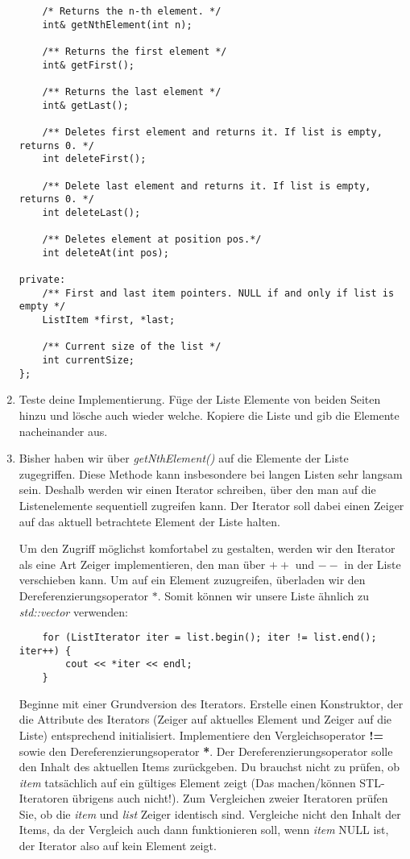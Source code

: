\begin{enumerate}
\begin{lstlisting}
	/* Returns the n-th element. */
	int& getNthElement(int n);

	/** Returns the first element */
	int& getFirst();

	/** Returns the last element */
	int& getLast();

	/** Deletes first element and returns it. If list is empty, returns 0. */
	int deleteFirst();

	/** Delete last element and returns it. If list is empty, returns 0. */
	int deleteLast();
	
	/** Deletes element at position pos.*/
	int deleteAt(int pos);

private:
	/** First and last item pointers. NULL if and only if list is empty */
	ListItem *first, *last;
	
	/** Current size of the list */
	int currentSize;
};
\end{lstlisting}

\item
Teste deine Implementierung.
Füge der Liste Elemente von beiden Seiten hinzu und lösche auch wieder welche.
Kopiere die Liste und gib die Elemente nacheinander aus.

\item 
Bisher haben wir über \emph{getNthElement()} auf die Elemente der Liste zugegriffen.
Diese Methode kann insbesondere bei langen Listen sehr langsam sein.
Deshalb werden wir einen Iterator schreiben, über den man auf die Listenelemente sequentiell zugreifen kann.
Der Iterator soll dabei einen Zeiger auf das aktuell betrachtete Element der Liste halten.

Um den Zugriff möglichst komfortabel zu gestalten, werden wir den Iterator als eine Art Zeiger implementieren, den man über \textbf{$++$} und \textbf{$--$} in der Liste verschieben kann.
Um auf ein Element zuzugreifen, überladen wir den Dereferenzierungsoperator $*$.
Somit können wir unsere Liste ähnlich zu \emph{std::vector} verwenden:
\begin{lstlisting}
	for (ListIterator iter = list.begin(); iter != list.end(); iter++) {
		cout << *iter << endl;
	}
\end{lstlisting}

Beginne mit einer Grundversion des Iterators.
Erstelle einen Konstruktor, der die Attribute des Iterators (Zeiger auf aktuelles Element und Zeiger auf die Liste) entsprechend initialisiert.
Implementiere den Vergleichsoperator \textbf{!=} sowie den Dereferenzierungsoperator \textbf{*}.
Der Dereferenzierungsoperator solle den Inhalt des aktuellen Items zurückgeben.
Du brauchst nicht zu prüfen, ob \emph{item} tatsächlich auf ein gültiges Element zeigt (Das machen/können STL-Iteratoren übrigens auch nicht!).
Zum Vergleichen zweier Iteratoren prüfen Sie, ob die \emph{item} und \emph{list} Zeiger identisch sind.
Vergleiche nicht den Inhalt der Items, da der Vergleich auch dann funktionieren soll, wenn \emph{item} NULL ist, der Iterator also auf kein Element zeigt.  \\


\end{enumerate}
